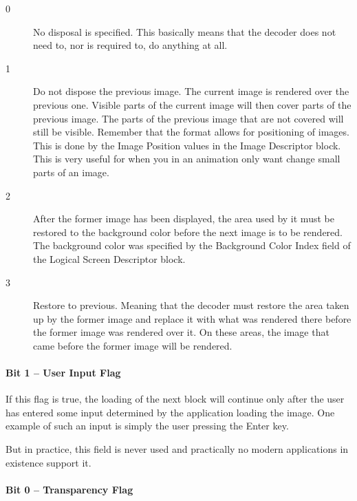 \begin{description}

\item[0] No disposal is specified. This basically means that the
  decoder does not need to, nor is required to, do anything at all.

\item[1] Do not dispose the previous image. The current image is
  rendered over the previous one. Visible parts of the current image
  will then cover parts of the previous image. The parts of the
  previous image that are not covered will still be visible. Remember
  that the \gif format allows for positioning of images. This is done
  by the Image Position values in the Image Descriptor block. This is
  very useful for when you in an animation only want change small
  parts of an image.

\item[2] After the former image has been displayed, the area used by
  it must be restored to the background color before the next image is
  to be rendered. The background color was specified by the Background
  Color Index field of the Logical Screen Descriptor block.

\item[3] Restore to previous. Meaning that the decoder must restore
  the area taken up by the former image and replace it with what was
  rendered there before the former image was rendered over it. On
  these areas, the image that came before the former image will be
  rendered.


\end{description}

\paragraph{Bit 1  -- User Input Flag}

If this flag is true, the loading of the next block will continue only
after the user has entered some input determined by the application
loading the image. One example of such an input is simply the user
pressing the Enter key.

But in practice, this field is never used and practically no modern
applications in existence support it.

\paragraph{Bit 0 -- Transparency Flag }

